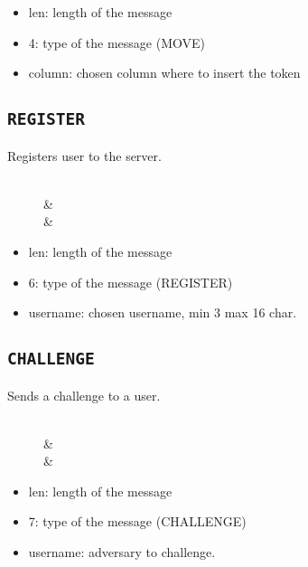 \begin{itemize}
	\item len: length of the message
	\item 4: type of the message (MOVE)
	\item column: chosen column where to insert the token
\end{itemize}


\subsection{\texttt{REGISTER}}
Registers user to the server.
\begin{figure}[h]
	\centering
	\begin{bytefield}[bitwidth=1.1em]{32}
		 \\
		&  \\
		& 
	\end{bytefield}
\end{figure}

\begin{itemize}
	\item len: length of the message
	\item 6: type of the message (REGISTER)
	\item username: chosen username, min 3 max 16 char.
\end{itemize}

\subsection{\texttt{CHALLENGE}}
Sends a challenge to a user.
\begin{figure}[h]
	\centering
	\begin{bytefield}[bitwidth=1.1em]{16}
		 \\
		&  \\
		& 
	\end{bytefield}
\end{figure}

\begin{itemize}
	\item len: length of the message
	\item 7: type of the message (CHALLENGE)
	\item username: adversary to challenge.
\end{itemize}

